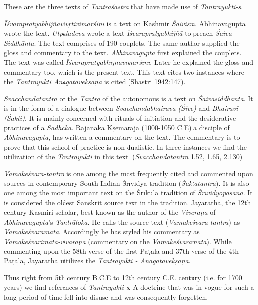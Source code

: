 These are the three texts of \textit{Tantraśāstra} that have made use of \textit{Tantrayukti-s}.

\textit{Īśvarapratyabhijñāvivṛtivimarśinī} is a text on Kashmir \textit{Śaivism}. Abhinavagupta wrote the text. \textit{Utpaladeva} wrote a text \textit{Ïśvarapratyabhijñā} to preach \textit{Śaiva Siddhānta}. The text comprises of 190 couplets. The same author supplied the gloss and commentary to the text. \textit{Abhinavagupta} first explained the couplets. The text was called \textit{Īśvarapratyabhijñāvimarśinī}. Later he explained the gloss and commentary too, which is the present text. This text cites two instances where the \textit{Tantrayukti Anāgatāvekṣaṇa} is cited (Shastri 1942:147).

\textit{Svacchandatantra} or the \textit{Tantra} of the autonomous is a text on \textit{Śaivasiddhānta}. It is in the form of a dialogue between \textit{Svacchandabhairava (Śiva)} and \textit{Bhairavī (Śakti)}. It is mainly concerned with rituals of initiation and the desiderative practices of a \textit{Sādhaka}. Rājanaka Kṣemarāja (1000-1050 C.E) a disciple of \textit{Abhinavagupta}, has written a commentary on the text. The commentary is to prove that this school of practice is non-dualistic. In three instances we find the utilization of the \textit{Tantrayukti} in this text. (\textit{Svacchandatantra} 1.52, 1.65, 2.130)

\textit{Vamakeśvara-tantra} is one among the most frequently cited and commented upon sources in contemporary South Indian Śrīvidyā tradition (\textit{Śāktatantra}). It is also one among the most important text on the Śrīkula tradition of \textit{Śrīvidyopāsanā}. It is considered the oldest Sanskrit source text in the tradition. Jayaratha, the 12th century Kasmiri scholar, best known as the author of the \textit{Vivaraṇa} of \textit{Abhinavagupta}’s \textit{Tantrāloka}. He calls the source text (\textit{Vamakeśvara-tantra}) as \textit{Vamakeśvaramata}. Accordingly he has styled his commentary as \textit{Vamakeśvarimata-vivaraṇa} (commentary on the \textit{Vamakeśvaramata}). While commenting upon the 58th verse of the first Paṭala and 37th verse of the 4th Paṭala, Jayaratha uitilizes the \textit{Tantrayukti - Anāgatāvekṣaṇa}.

Thus right from 5th century B.C.E to 12th century C.E. century (i.e. for 1700 years) we find references of \textit{Tantrayukti-s}. A doctrine that was in vogue for such a long period of time fell into disuse and was consequently forgotten.


